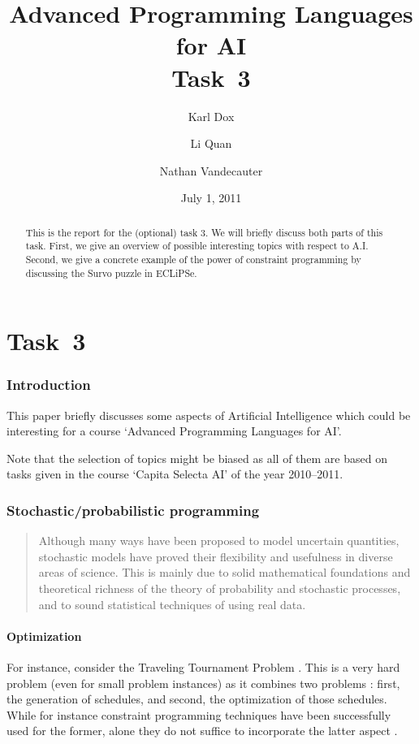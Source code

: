 \documentclass[a4paper,11pt,english]{article}
\title{Advanced Programming Languages for AI\\ Task~3}
\author{Karl Dox \and Li Quan  \and Nathan Vandecauter }
\date{July 1, 2011}
\begin{document}
\maketitle
\begin{abstract}
This is the report for the (optional) task 3. We will briefly discuss both parts of this task. First, we give an overview of possible interesting topics with respect to A.I. 
Second, we give a concrete example of the power of constraint programming by discussing the Survo puzzle in ECLiPSe.
\end{abstract}
\part{Task~3}
\section{Introduction}
This paper briefly discusses some aspects of Artificial Intelligence which could be interesting for a course `Advanced Programming Languages for AI'.

Note that the selection of topics might be biased as all of them are based on tasks given in the course `Capita Selecta AI' of the year 2010--2011.

\section{Stochastic/probabilistic programming}
\begin{quote}
 Although many ways have been proposed to model uncertain quantities, stochastic models have proved their flexibility and usefulness in diverse areas of science. 
This is mainly due to solid mathematical foundations and theoretical richness of the theory of probability and stochastic processes, and to sound statistical techniques of using real data. \cite{shapiro}
\end{quote}

\subsection*{Optimization}
For instance, consider the Traveling Tournament Problem \cite{ttp,website}. This is a very hard problem (even for small problem instances) as it combines two problems \cite{Benoist01lagrangerelaxation}: first, the generation of schedules, and second, the optimization of those schedules. While for instance constraint programming techniques have been successfully used for the former, alone they do not suffice to incorporate the latter aspect \cite{constraintscheduling}. 
\end{document}
